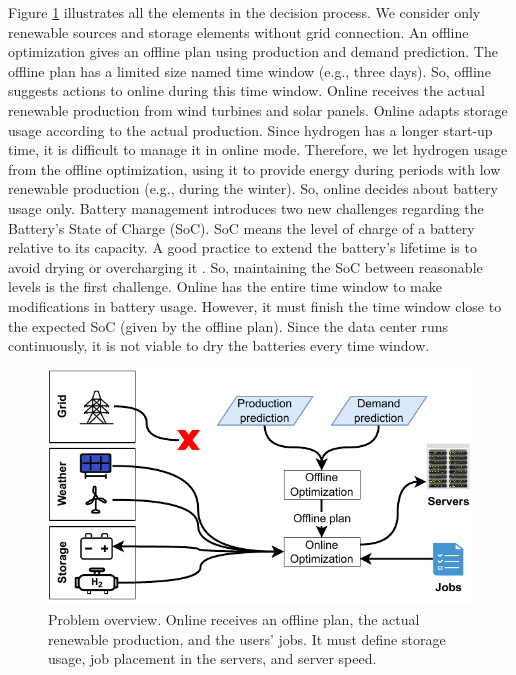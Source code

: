 Figure \ref{fig:introduction_problem} illustrates all the elements in the decision process. We consider only renewable sources and storage elements without grid connection. An offline optimization gives an offline plan using production and demand prediction. The offline plan has a limited size named time window (e.g., three days). So, offline suggests actions to online during this time window. Online receives the actual renewable production from wind turbines and solar panels. Online adapts storage usage according to the actual production. Since hydrogen has a longer start-up time, it is difficult to manage it in online mode. Therefore, we let hydrogen usage from the offline optimization, using it to provide energy during periods with low renewable production (e.g., during the winter). So, online decides about battery usage only. Battery management introduces two new challenges regarding the Battery's State of Charge (SoC). SoC means the level of charge of a battery relative to its capacity. A good practice to extend the battery's lifetime is to avoid drying or overcharging it \cite{xu2016modeling}. So, maintaining the SoC between reasonable levels is the first challenge. Online has the entire time window to make modifications in battery usage. However, it must finish the time window close to the expected SoC (given by the offline plan). Since the data center runs continuously, it is not viable to dry the batteries every time window. 

\begin{figure}[!htb]
    \centering
    \includegraphics[scale=1]{Images/Introduction/Problem_overview_thesis.pdf}
    \caption{Problem overview. Online receives an offline plan, the actual renewable production, and the users' jobs. It must define storage usage, job placement in the servers, and server speed.}
    \label{fig:introduction_problem}
\end{figure}

